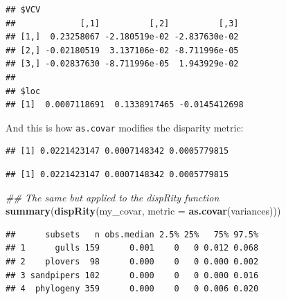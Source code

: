 \documentclass[
]{book}
\newenvironment{Shaded}{\begin{snugshade}}{\end{snugshade}}
\newcommand{\CommentTok}[1]{\textcolor[rgb]{0.56,0.35,0.01}{\textit{#1}}}
\newcommand{\DataTypeTok}[1]{\textcolor[rgb]{0.13,0.29,0.53}{#1}}
\newcommand{\DecValTok}[1]{\textcolor[rgb]{0.00,0.00,0.81}{#1}}
\newcommand{\KeywordTok}[1]{\textcolor[rgb]{0.13,0.29,0.53}{\textbf{#1}}}
\newcommand{\NormalTok}[1]{#1}
\newcommand{\OperatorTok}[1]{\textcolor[rgb]{0.81,0.36,0.00}{\textbf{#1}}}
\newcommand{\StringTok}[1]{\textcolor[rgb]{0.31,0.60,0.02}{#1}}
\begin{document}
\begin{verbatim}
## $VCV
##             [,1]          [,2]          [,3]
## [1,]  0.23258067 -2.180519e-02 -2.837630e-02
## [2,] -0.02180519  3.137106e-02 -8.711996e-05
## [3,] -0.02837630 -8.711996e-05  1.943929e-02
## 
## $loc
## [1]  0.0007118691  0.1338917465 -0.0145412698
\end{verbatim}

And this is how \texttt{as.covar} modifies the disparity metric:

\begin{Shaded}
\end{Shaded}

\begin{verbatim}
## [1] 0.0221423147 0.0007148342 0.0005779815
\end{verbatim}

\begin{Shaded}
\end{Shaded}

\begin{verbatim}
## [1] 0.0221423147 0.0007148342 0.0005779815
\end{verbatim}

\begin{Shaded}
\begin{Highlighting}[]
\CommentTok{\#\# The same but applied to the dispRity function}
\KeywordTok{summary}\NormalTok{(}\KeywordTok{dispRity}\NormalTok{(my\_covar, }\DataTypeTok{metric =} \KeywordTok{as.covar}\NormalTok{(variances)))}
\end{Highlighting}
\end{Shaded}

\begin{verbatim}
##      subsets   n obs.median 2.5% 25%   75% 97.5%
## 1      gulls 159      0.001    0   0 0.012 0.068
## 2    plovers  98      0.000    0   0 0.000 0.002
## 3 sandpipers 102      0.000    0   0 0.000 0.016
## 4  phylogeny 359      0.000    0   0 0.006 0.020
\end{verbatim}
\end{document}
